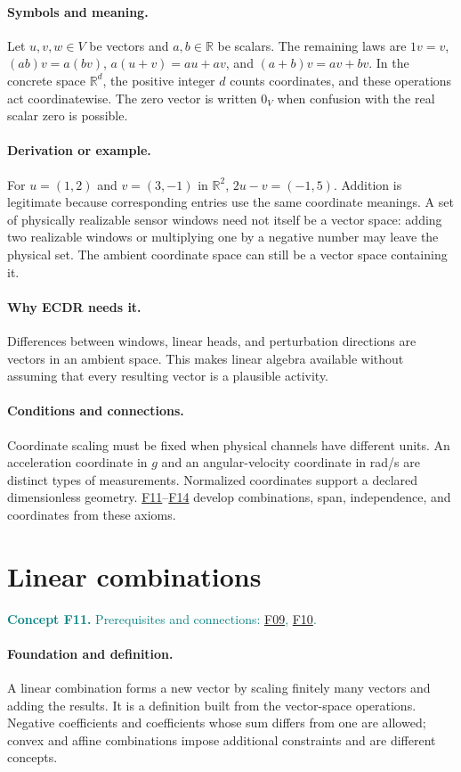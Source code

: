 \documentclass[11pt,a4paper]{article}
\newcommand{\R}{\mathbb R}
\newcommand{\conceptid}{Front matter}
\newcommand{\concept}[3]{\clearpage\renewcommand{\conceptid}{#1}%
\section{#2}\label{concept:#1}%
\textcolor{teal}{\textbf{Concept #1.} Prerequisites and connections: #3.}\par
\typeout{ECDR-CONCEPT-START #1 PAGE=\thepage}}
\begin{document}
\paragraph{Symbols and meaning.}
Let $u,v,w\in V$ be vectors and $a,b\in\R$ be scalars. The remaining
laws are $1v=v$, $(ab)v=a(bv)$,
$a(u+v)=au+av$, and $(a+b)v=av+bv$. In the concrete space $\R^d$,
the positive integer $d$ counts coordinates, and these operations act
coordinatewise. The zero vector is written $0_V$ when confusion with
the real scalar zero is possible.
\paragraph{Derivation or example.}
For $u=(1,2)$ and $v=(3,-1)$ in $\R^2$,
$2u-v=(-1,5)$. Addition is legitimate because corresponding entries use
the same coordinate meanings. A set of physically realizable sensor
windows need not itself be a vector space: adding two realizable windows
or multiplying one by a negative number may leave the physical set.
The ambient coordinate space can still be a vector space containing it.
\paragraph{Why ECDR needs it.}
Differences between windows, linear heads, and perturbation directions
are vectors in an ambient space. This makes linear algebra available
without assuming that every resulting vector is a plausible activity.
\paragraph{Conditions and connections.}
Coordinate scaling must be fixed when physical channels have different
units. An acceleration coordinate in $g$ and an angular-velocity coordinate
in rad/s are distinct types of measurements. Normalized coordinates
support a declared dimensionless geometry. \hyperref[concept:F11]{F11}--\hyperref[concept:F14]{F14} develop combinations,
span, independence, and coordinates from these axioms.
\par\label{endconcept:F10}

\concept{F11}{Linear combinations}{\hyperref[concept:F09]{F09}, \hyperref[concept:F10]{F10}}
\paragraph{Foundation and definition.}
A linear combination forms a new vector by scaling finitely many vectors
and adding the results. It is a definition built from the vector-space
operations. Negative coefficients and coefficients whose sum differs
from one are allowed; convex and affine combinations impose additional
constraints and are different concepts.
\end{document}
